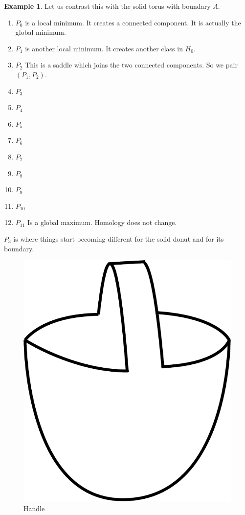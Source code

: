 \documentclass[a4paper]{article}
\theoremstyle{theorem}
\theoremstyle{definition}
\newtheorem{example}{Example}
\theoremstyle{remark}
\theoremstyle{gremark}
\theoremstyle{discussion}
\theoremstyle{notation}
\begin{document}
\begin{example}
	




	Let us contrast this with the solid torus with boundary $A$.
	
	\begin{enumerate}
		\item $P_0$ is a local minimum. It creates a connected component. It is actually the global minimum.
		\item $P_1$ is another local minimum. It creates another class in $H_0$.
		\item $P_2$ This is a saddle which joins the two connected components. So we pair $(P_1,P_2)$.
		\item $P_3$ 
		\item $P_4$ 
		\item $P_5$ 
		\item $P_6$ 
		\item $P_7$ 
		\item $P_8$ 
		\item $P_9$ 
		\item $P_{10}$ 
		\item $P_{11}$ Is a global maximum. Homology does not change.
	\end{enumerate} 

	$P_3$ is where things start becoming different for the solid donut and for its boundary.

	
	
	
	
	
	
	
\end{example}

\begin{figure}[ht]
	\centering
	\includegraphics[scale=0.5]{handle.png}
	\caption{Handle}
\end{figure}
\end{document}
